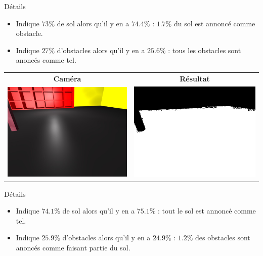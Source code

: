 \begin{frame}
\begin{center}
{\begin{tabular}{cc}
            \end{tabular}
            \begin{block}{Détails}
                \begin{itemize}
                    \item Indique $73\%$ de sol alors qu'il y en a $74.4\%$ : $1.7\%$  du sol est annoncé comme obstacle.
                    \item Indique $27\%$ d'obstacles alors qu'il y en a $25.6\%$ : tous les obstacles sont anoncés comme tel.
                \end{itemize}
            \end{block}
        }  {
            \begin{tabular}{cc}
                \textbf{Caméra} & \textbf{Résultat} \\
                \includegraphics[width=0.4\linewidth]{rcs/abodv2s.png} & \includegraphics[width=0.4\linewidth]{rcs/abodv2r.png} \\
            \end{tabular}
            \begin{block}{Détails}
                \begin{itemize}
                    \item Indique $74.1\%$ de sol alors qu'il y en a $75.1\%$ : tout le sol est annoncé comme tel.
                    \item Indique $25.9\%$ d'obstacles alors qu'il y en a $24.9\%$ : $1.2\%$ des obstacles sont anoncés comme faisant partie du sol.
                \end{itemize}
            \end{block}
        }
    \end{center}
\end{frame}

